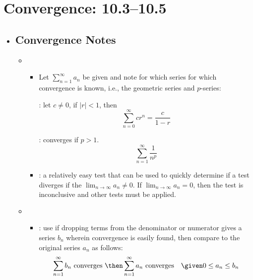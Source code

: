 \section{Convergence: 10.3--10.5}
\begin{itemize}
  \item[]

  \subsection{Convergence Notes}
  \begin{itemize}
    \item {}
    \begin{itemize}

     \item Let \(\displaystyle \sum_{n=1}^{\infty} a_n\) be given and note for
      which series for which convergence is known, i.e., the geometric series
      and \(p\)-series:
      \begin{multicols}{2}
        : let \(c \neq 0\), if \(|r| < 1\), then
        \[%
          \sum_{n=0}^{\infty} cr^n = \frac{c}{1-r}
        \]%

        : converges if \(p > 1\).
        \[%
          \sum_{n=1}^{\infty} \frac{1}{n^p}
        \]%
      \end{multicols}

      \item {}: a relatively easy
      test that can be used to quickly determine if a test diverges if the
      \(\lim_{n \to \infty} a_n \neq 0 \). If \(\lim_{n \to \infty} a_n = 0\),
      then the test is inconclusive and other tests must be applied.
      \end{itemize}

    \vspace{16pt}

    \item {}
      \begin{itemize}
        \item {}: use if dropping terms from the
          denominator or numerator gives a series \(b_n\) wherein convergence
          is easily found, then compare to the original series \(a_n\) as
          follows:
          \[%
          \sum_{n=1}^{\infty} b_n ~\text{converges}~ \then
          \sum_{n=1}^{\infty} a_n ~\text{converges} \quad \given 0 \leq a_n
          \leq b_n
          \]%


\end{itemize}
\end{itemize}
\end{itemize}
